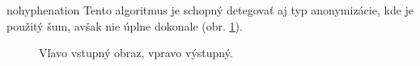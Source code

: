 \begin{hyphenrules}{nohyphenation}
Tento algoritmus je schopný detegovať aj typ anonymizácie, kde je použitý šum, avšak nie úplne dokonale (obr. \ref{fig:4.6}).
\begin{figure}[H]
\begin{minipage}[t]{.4\linewidth}
\caption{Vľavo vstupný obraz, vpravo výstupný.}
\label{fig:4.6} 
\end{minipage}\hfill
\begin{minipage}[b]{.4\linewidth}

\end{minipage}
\end{figure}
\end{hyphenrules}

